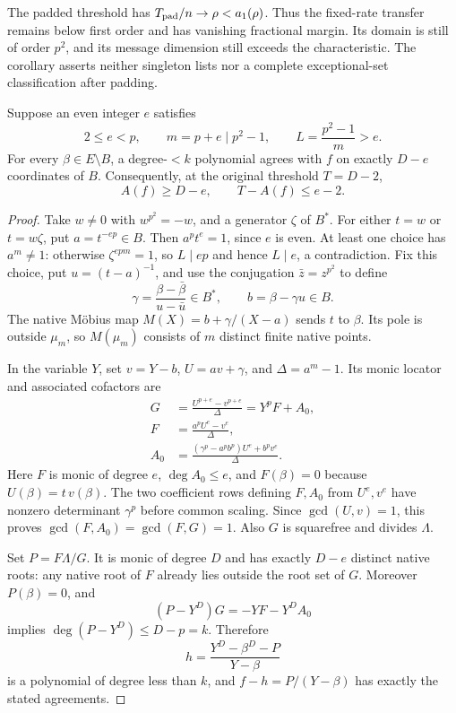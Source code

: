 The padded threshold has $T_{\rm pad}/n\to\rho<a_1(\rho)$.
Thus the fixed-rate transfer remains below first order and has
vanishing fractional margin. Its domain is still of order $p^2$,
and its message dimension still exceeds the characteristic.
The corollary asserts neither singleton lists nor a complete
exceptional-set classification after padding.

\begin{lemma}
\label{lem:hermitian-zero-endpoint-competitor}
Suppose an even integer $e$ satisfies
\[
 2\le e<p,\qquad m=p+e\mid p^2-1,\qquad
 L=\frac{p^2-1}{m}>e.
\]
For every $\beta\in E\setminus B$, a degree-$<k$ polynomial agrees
with $f$ on exactly $D-e$ coordinates of $B$.
Consequently, at the original threshold $T=D-2$,
\[
 A(f)\ge D-e,\qquad T-A(f)\le e-2.
\]
\end{lemma}
\begin{proof}
Take $w\ne0$ with $w^{p^2}=-w$, and a generator $\zeta$ of $B^*$.
For either $t=w$ or $t=w\zeta$, put $a=t^{-ep}\in B$.
Then $a^pt^e=1$, since $e$ is even. At least one choice has
$a^m\ne1$: otherwise $\zeta^{epm}=1$, so $L\mid ep$ and hence
$L\mid e$, a contradiction. Fix this choice, put $u=(t-a)^{-1}$,
and use the conjugation $\bar z=z^{p^2}$ to define
\[
 \gamma=\frac{\beta-\bar\beta}{u-\bar u}\in B^*,
 \qquad b=\beta-\gamma u\in B.
\]
The native M\"obius map $M(X)=b+\gamma/(X-a)$ sends $t$ to $\beta$.
Its pole is outside $\mu_m$, so $M(\mu_m)$ consists of $m$ distinct
finite native points.

In the variable $Y$, set $v=Y-b$, $U=av+\gamma$, and
$\Delta=a^m-1$. Its monic locator and associated cofactors are
\[
 \begin{aligned}
 G&=\frac{U^{p+e}-v^{p+e}}{\Delta}=Y^pF+A_0,\\
 F&=\frac{a^pU^e-v^e}{\Delta},\\
 A_0&=\frac{(\gamma^p-a^pb^p)U^e+b^pv^e}{\Delta}.
 \end{aligned}
\]
Here $F$ is monic of degree $e$, $\deg A_0\le e$, and
$F(\beta)=0$ because $U(\beta)=t\,v(\beta)$.
The two coefficient rows defining $F,A_0$ from $U^e,v^e$ have
nonzero determinant $\gamma^p$ before common scaling.
Since $\gcd(U,v)=1$, this proves $\gcd(F,A_0)=\gcd(F,G)=1$.
Also $G$ is squarefree and divides $\Lambda$.

Set $P=F\Lambda/G$. It is monic of degree $D$ and has exactly
$D-e$ distinct native roots: any native root of $F$ already lies
outside the root set of $G$. Moreover $P(\beta)=0$, and
\[
 (P-Y^D)G=-YF-Y^D A_0
\]
implies $\deg(P-Y^D)\le D-p=k$. Therefore
\[
 h=\frac{Y^D-\beta^D-P}{Y-\beta}
\]
is a polynomial of degree less than $k$, and
$f-h=P/(Y-\beta)$ has exactly the stated agreements.
\end{proof}

